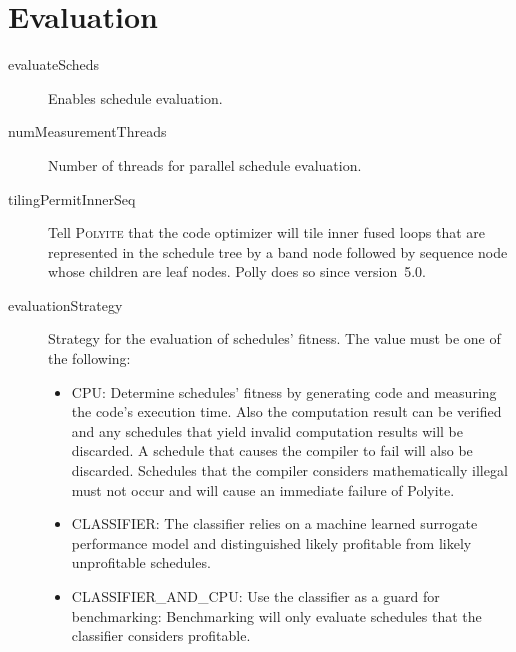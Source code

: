\documentclass{article}
\begin{document}
\section{Evaluation}
\begin{description}
  \item[evaluateScheds] Enables schedule evaluation.
  \item[numMeasurementThreads] Number of threads for parallel schedule
    evaluation.
  \item[tilingPermitInnerSeq] Tell \textsc{Polyite} that the code optimizer
    will tile inner fused loops that are represented in the schedule tree by a
    band node followed by sequence node whose children are leaf nodes. Polly
    does so since version~5.0.
    \item[evaluationStrategy] Strategy for the evaluation of schedules'
    fitness. The value must be one of the following:
    \begin{itemize}
      \item CPU: Determine schedules' fitness by generating code and measuring
      the code's execution time. Also the computation result can be verified and
      any schedules that yield invalid computation results will be discarded. A
      schedule that causes the compiler to fail will also be discarded.
      Schedules that the compiler considers mathematically illegal must not
      occur and will cause an immediate failure of Polyite.
      \item CLASSIFIER: The classifier relies on a machine learned surrogate
      performance model and distinguished likely profitable from likely
      unprofitable schedules.
      \item CLASSIFIER\_AND\_CPU: Use the classifier as a guard for
      benchmarking: Benchmarking will only evaluate schedules that the
      classifier considers profitable.
    \end{itemize}
\end{description}
\end{document}
